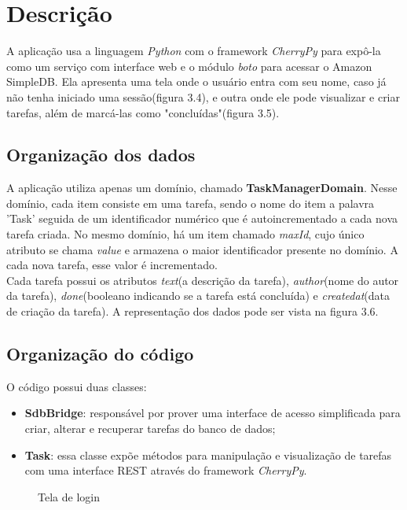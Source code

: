 \section{Descrição}
A aplicação usa a linguagem \textit{Python} com o framework \textit{CherryPy} para expô-la como um serviço com interface web e o módulo \textit{boto} para acessar o Amazon SimpleDB.
Ela apresenta uma tela onde o usuário entra com seu nome, caso já não tenha iniciado uma sessão(figura 3.4), e outra onde ele  pode visualizar e criar tarefas, além de marcá-las como "concluídas"(figura 3.5).

\subsection{Organização dos dados}
A aplicação utiliza apenas um domínio, chamado \textbf{TaskManagerDomain}. Nesse domínio, cada item consiste em uma tarefa, sendo o nome do item a palavra 'Task' seguida de um identificador numérico que é autoincrementado a cada nova tarefa criada. No mesmo domínio, há um item chamado \textit{maxId}, cujo único atributo se chama \textit{value} e armazena o maior identificador presente no domínio. A cada nova tarefa, esse valor é incrementado.\\
Cada tarefa possui os atributos \textit{text}(a descrição da tarefa), \textit{author}(nome do autor da tarefa), \textit{done}(booleano indicando se a tarefa está concluída) e \textit{created{\textunderscore}at}(data de criação da tarefa). A representação dos dados pode ser vista na figura 3.6.

\subsection{Organização do código}
O código possui duas classes:
\begin{itemize}
	\item \textbf{SdbBridge}: responsável por prover uma interface de acesso simplificada para criar, alterar e recuperar tarefas do banco de dados;
	\item \textbf{Task}: essa classe expõe métodos para manipulação e visualização de tarefas com uma interface REST através do framework \textit{CherryPy}.
\end{itemize}

\begin{figure}
	\centering
	\label{fig:app_tela_login}
	\caption{Tela de login}
\end{figure}

